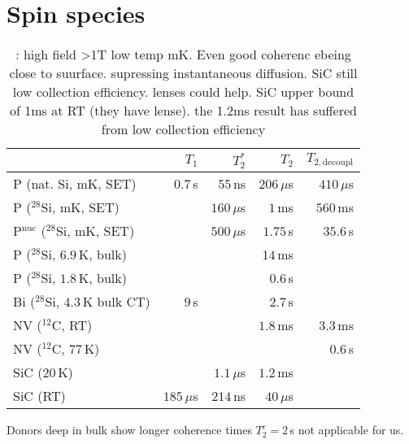 
\section{Spin species}


\begin{table}
\begin{tabular}{lrrrr}
	& $T_1$ & $T_2^{*}$ & $T_2$ & $T_{2,\textrm{decoupl}}$ \\ \hline
P (nat. Si, mK, SET) \cite{Pla2012}& $0.7\, $s & $55\, $ns  & $206\, \mu$s & $410\, \mu$s  \\
P ($^{28}$Si, mK, SET) \cite{Muhonen2014}&  & $160\, \mu$s  & $1\, $ms & $560\, $ms \\
P$^{\text{nuc}}$ ($^{28}$Si, mK, SET) \cite{Muhonen2014}& & $500\, \mu$s & $1.75\, $s & $35.6\, $s \\
P ($^{28}$Si, $6.9\, $K, bulk) \cite{Morley2010}& &  & $14\, $ms &  \\
P ($^{28}$Si, $1.8\, $K, bulk) \cite{Tyryshkin2011}& &  & $0.6\, $s &  \\
Bi ($^{28}$Si, $4.3\, $K bulk CT) \cite{Wolfowicz2013} & $9\, $s &  & $2.7\, $s &\\
NV ($^{12}$C, RT) \cite{Balasubramanian2009,Bar-Gill2013} & & & $1.8\, $ms & $3.3\, $ms \\
NV ($^{12}$C, $77\, $K) \cite{Bar-Gill2013} & & &  & $0.6\, $s \\
SiC ($20\, $K) \cite{Christle2014} & & $1.1\, \mu$s & $1.2\, $ms &  \\
SiC (RT) \cite{Koehl2011} & $185\, \mu$s & $214\, $ns & $40\, \mu$s &   \\
\hline
\end{tabular} 
\caption{\cite{Pla2012,Muhonen2014}: high field >1T low temp mK. Even good coherenc ebeing close to suurface. \cite{Tyryshkin2011} supressing instantaneous diffusion. SiC still low collection efficiency. lenses could help. SiC upper bound of 1ms at RT \cite{Widmann2014} (they have lense). the 1.2ms result has suffered from low collection efficiency}
\label{TAB:qubits}
\end{table}

Donors deep in bulk show longer coherence times $T_2^e=2\, $s \cite{Tyryshkin2011} not applicable for us.

